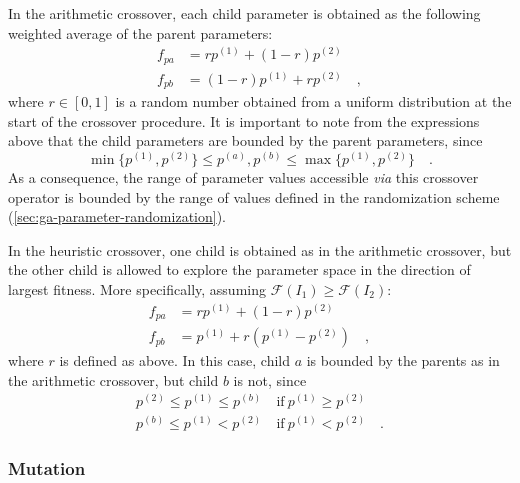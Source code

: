 \documentclass[10pt,a4paper]{report}
\numberwithin{equation}{section}
\begin{document}
In the arithmetic crossover, each child parameter is obtained as the following
weighted average of the parent parameters:
\begin{align}
  \label{eq:ga-crossover-arithmetic}
  f_{pa} & = rp^{(1)} + (1-r)p^{(2)} \\ \nonumber
  f_{pb} & = (1-r)p^{(1)} + rp^{(2)} \quad ,
\end{align}
where $r \in [0,1]$ is a random number obtained from a uniform distribution at
the start of the crossover procedure.
It is important to note from the expressions above that the child parameters are
bounded by the parent parameters, since
\begin{equation*}
  \min{\{p^{(1)},p^{(2)}\}} \leq p^{(a)},p^{(b)} \leq \max{\{p^{(1)},p^{(2)}\}} \quad .
\end{equation*}
As a consequence, the range of parameter values accessible \textit{via} this crossover operator
is bounded by the range of values defined in the randomization scheme (\autoref{sec:ga-parameter-randomization}).

In the heuristic crossover, one child is obtained as in the arithmetic crossover, but the other
child is allowed to explore the parameter space in the direction of largest fitness. More specifically,
assuming $\mathcal{F}(I_1) \geq \mathcal{F}(I_2)$:
\begin{align}
  \label{eq:ga-crossover-heuristic}
  f_{pa} & = rp^{(1)} + (1-r)p^{(2)} \\ \nonumber
  f_{pb} & = p^{(1)} + r(p^{(1)} - p^{(2)}) \quad ,
\end{align}
where $r$ is defined as above. In this case, child $a$ is bounded by
the parents as in the arithmetic crossover, but child $b$ is not, since
\begin{align*}
  p^{(2)} \leq p^{(1)} \leq p^{(b)} &\ \text{if}\  p^{(1)} \geq p^{(2)} \\
  p^{(b)} \leq p^{(1)} < p^{(2)} &\ \text{if}\  p^{(1)} < p^{(2)} \quad .
\end{align*}

\subsubsection{Mutation}
\label{sec:ga-mutation}
\end{document}
